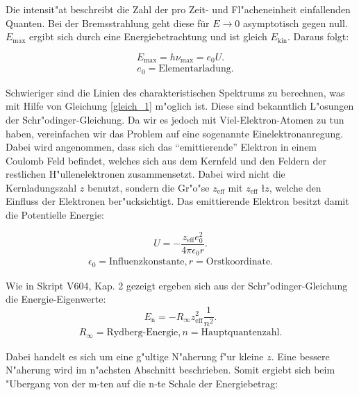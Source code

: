 		Die intensit"at beschreibt die Zahl der pro Zeit- und Fl"acheneinheit einfallenden Quanten.
		Bei der Bremsstrahlung geht diese für $E \rightarrow 0$ asymptotisch gegen null. $E_\mathrm{max}$ ergibt sich durch eine Energiebetrachtung und ist gleich $E_\mathrm{kin}$.
		Daraus folgt:

		\begin{equation}
			E_\mathrm{max} = h\nu_\mathrm{max} = e_\mathrm{0}U. \label{gleich_2}
		\end{equation}
		\begin{eqnarray*}
			\quad e_\mathrm{0} = \text{Elementarladung}.
		\end{eqnarray*}

		Schwieriger sind die Linien des charakteristischen Spektrums zu berechnen, was mit Hilfe von Gleichung \ref{gleich_1} m"oglich ist.
		Diese sind bekanntlich L"osungen der Schr"odinger-Gleichung. 
		Da wir es jedoch mit Viel-Elektron-Atomen zu tun haben, vereinfachen wir das Problem auf eine sogenannte Einelektronanregung.
		Dabei wird angenommen, dass sich das "`emittierende"' Elektron in einem Coulomb Feld befindet, welches sich aus dem Kernfeld und den Feldern der restlichen H"ullenelektronen zusammensetzt.
		Dabei wird nicht die Kernladungszahl $z$ benutzt, sondern die Gr"o"se $z_\mathrm{eff}$ mit $z_\mathrm{eff}$ \l $z$, welche den Einfluss der Elektronen ber"ucksichtigt.
		Das emittierende Elektron besitzt damit die Potentielle Energie:

		\begin{equation}
			U = -\frac{z_\mathrm{eff} e_\mathrm{0}^2}{4 \pi \epsilon_\mathrm{0} r}. \label{gleich_3}
		\end{equation}
		\begin{eqnarray*}
			\epsilon_\mathrm{0} = \text{Influenzkonstante,}\, r = \text{Orstkoordinate}.
		\end{eqnarray*}

		Wie in Skript V604, Kap. 2 gezeigt ergeben sich aus der Schr"odinger-Gleichung die Energie-Eigenwerte: 		
		\begin{equation}
			E_\mathrm{n} = - R_\infty z_\mathrm{eff}^2 \frac{1}{n^2}. \label{gleich_4}
		\end{equation}
		\begin{eqnarray*}
			R_\infty = \text{Rydberg-Energie,}\, n = \text{Hauptquantenzahl}.
		\end{eqnarray*}

		Dabei handelt es sich um eine g"ultige N"aherung f"ur kleine $z$.
		Eine bessere N"aherung wird im n"achsten Abschnitt beschrieben.
		Somit ergiebt sich beim "Ubergang von der m-ten auf die n-te Schale der Energiebetrag:

